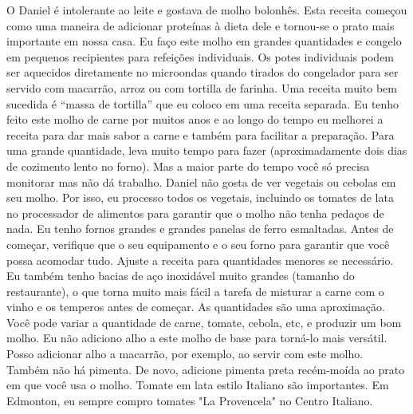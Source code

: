 \documentclass[11pt,letterpaper]{article}
\begin{document}


O Daniel é intolerante ao leite e gostava de molho bolonhês. Esta receita começou como uma maneira de adicionar proteínas \`a dieta dele e tornou-se o prato mais importante em nossa casa. Eu faço este molho em grandes quantidades e congelo em pequenos recipientes para refei\c{c}\~oes individuais. Os potes individuais podem ser aquecidos diretamente no microondas quando tirados do congelador para ser servido com macarrão, arroz ou com tortilla de farinha. Uma receita muito bem sucedida é ``massa de tortilla'' que eu coloco em uma receita separada. Eu tenho feito este molho de carne por muitos anos e ao longo do tempo eu melhorei a receita para dar mais sabor a carne e também para facilitar a preparação. 
Para uma grande quantidade, leva muito tempo para fazer (aproximadamente dois dias de cozimento lento no forno). Mas a maior parte do tempo voc\^e s\'o precisa monitorar mas n\~ao d\'a trabalho. Daniel não gosta de ver vegetais ou cebolas em seu molho. Por isso, eu processo todos os vegetais, incluindo os tomates de lata no processador de alimentos para garantir que o molho não tenha pedaços de nada. Eu tenho fornos grandes e grandes panelas de ferro esmaltadas. Antes de come\c{c}ar, verifique que o seu equipamento e o seu forno para garantir que você possa acomodar tudo.  Ajuste a receita para quantidades menores se necess\'ario. Eu também tenho bacias de aço inoxidável muito grandes (tamanho do restaurante), o que torna muito mais fácil a tarefa de misturar a carne com o vinho e os temperos antes de começar.
As quantidades são uma aproximação. Você pode variar a quantidade de carne, tomate, cebola, etc, e produzir um bom molho. Eu não adiciono alho a este molho de base para torná-lo mais versátil. Posso adicionar alho a macarrão, por exemplo, ao servir com este molho. Também não há pimenta. De novo, adicione pimenta preta recém-moída ao prato em que você usa o molho. Tomate em lata estilo Italiano s\~ao importantes. Em Edmonton, eu sempre compro tomates "La Provencela" no Centro Italiano.
\end{document}
